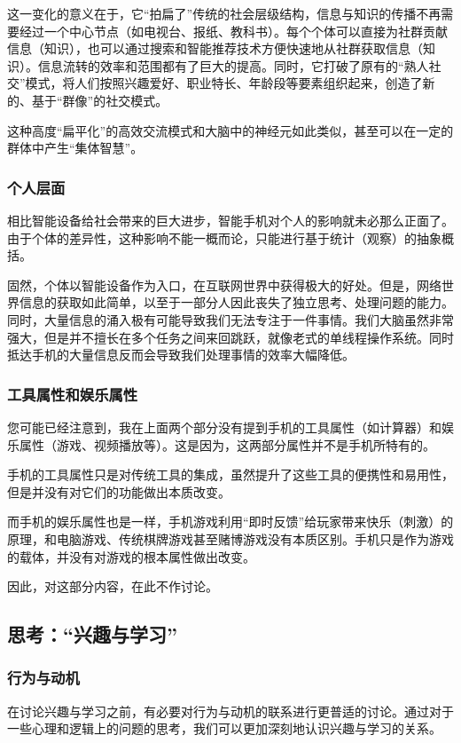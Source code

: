             这一变化的意义在于，它“拍扁了”传统的社会层级结构，信息与知识的传播不再需要经过一个中心节点（如电视台、报纸、教科书）。每个个体可以直接为社群贡献信息（知识），也可以通过搜索和智能推荐技术方便快速地从社群获取信息（知识）。信息流转的效率和范围都有了巨大的提高。同时，它打破了原有的“熟人社交”模式，将人们按照兴趣爱好、职业特长、年龄段等要素组织起来，创造了新的、基于“群像”的社交模式。
            
            这种高度“扁平化”的高效交流模式和大脑中的神经元如此类似，甚至可以在一定的群体中产生“集体智慧”。

        \subsubsection*{个人层面}
            相比智能设备给社会带来的巨大进步，智能手机对个人的影响就未必那么正面了。由于个体的差异性，这种影响不能一概而论，只能进行基于统计（观察）的抽象概括。

            固然，个体以智能设备作为入口，在互联网世界中获得极大的好处。但是，网络世界信息的获取如此简单，以至于一部分人因此丧失了独立思考、处理问题的能力。同时，大量信息的涌入极有可能导致我们无法专注于一件事情。我们大脑虽然非常强大，但是并不擅长在多个任务之间来回跳跃，就像老式的单线程操作系统。同时抵达手机的大量信息反而会导致我们处理事情的效率大幅降低。

        \subsubsection*{工具属性和娱乐属性}
            您可能已经注意到，我在上面两个部分没有提到手机的工具属性（如计算器）和娱乐属性（游戏、视频播放等）。这是因为，这两部分属性并不是手机所特有的。
            
            手机的工具属性只是对传统工具的集成，虽然提升了这些工具的便携性和易用性，但是并没有对它们的功能做出本质改变。

            而手机的娱乐属性也是一样，手机游戏利用“即时反馈”给玩家带来快乐（刺激）的原理，和电脑游戏、传统棋牌游戏甚至赌博游戏没有本质区别。手机只是作为游戏的载体，并没有对游戏的根本属性做出改变。

            因此，对这部分内容，在此不作讨论。

    \subsection{思考：“兴趣与学习”}
        \subsubsection*{行为与动机}
            在讨论兴趣与学习之前，有必要对行为与动机的联系进行更普适的讨论。通过对于一些心理和逻辑上的问题的思考，我们可以更加深刻地认识兴趣与学习的关系。
            
